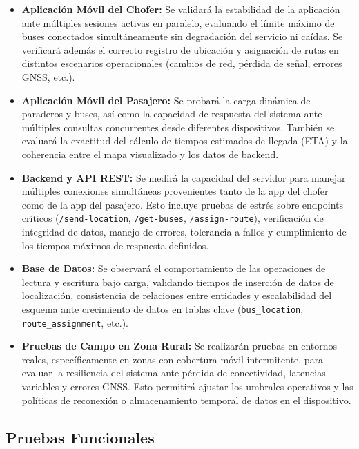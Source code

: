 \documentclass[12pt]{article}
\begin{document}
\begin{itemize}
    \item \textbf{Aplicación Móvil del Chofer:} Se validará la estabilidad de la aplicación ante múltiples sesiones activas en paralelo, evaluando el límite máximo de buses conectados simultáneamente sin degradación del servicio ni caídas. Se verificará además el correcto registro de ubicación y asignación de rutas en distintos escenarios operacionales (cambios de red, pérdida de señal, errores GNSS, etc.).

    \item \textbf{Aplicación Móvil del Pasajero:} Se probará la carga dinámica de paraderos y buses, así como la capacidad de respuesta del sistema ante múltiples consultas concurrentes desde diferentes dispositivos. También se evaluará la exactitud del cálculo de tiempos estimados de llegada (ETA) y la coherencia entre el mapa visualizado y los datos de backend.

    \item \textbf{Backend y API REST:} Se medirá la capacidad del servidor para manejar múltiples conexiones simultáneas provenientes tanto de la app del chofer como de la app del pasajero. Esto incluye pruebas de estrés sobre endpoints críticos (\texttt{/send-location}, \texttt{/get-buses}, \texttt{/assign-route}), verificación de integridad de datos, manejo de errores, tolerancia a fallos y cumplimiento de los tiempos máximos de respuesta definidos.

    \item \textbf{Base de Datos:} Se observará el comportamiento de las operaciones de lectura y escritura bajo carga, validando tiempos de inserción de datos de localización, consistencia de relaciones entre entidades y escalabilidad del esquema ante crecimiento de datos en tablas clave (\texttt{bus\_location}, \texttt{route\_assignment}, etc.).

    \item \textbf{Pruebas de Campo en Zona Rural:} Se realizarán pruebas en entornos reales, específicamente en zonas con cobertura móvil intermitente, para evaluar la resiliencia del sistema ante pérdida de conectividad, latencias variables y errores GNSS. Esto permitirá ajustar los umbrales operativos y las políticas de reconexión o almacenamiento temporal de datos en el dispositivo.
\end{itemize}

\clearpage
\newpage
\subsection*{Pruebas Funcionales}
\end{document}
